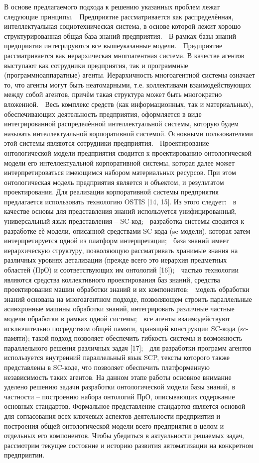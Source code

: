 В основе предлагаемого подхода к решению указанных проблем лежат следующие принципы.
 Предприятие рассматривается как распределѐнная, интеллектуальная социотехническая
система, в основе которой лежит хорошо структурированная общая база знаний предприятия.
 В рамках базы знаний предприятия интегрируются все вышеуказанные модели.
 Предприятие рассматривается как иерархическая многоагентная система. В качестве
агентов выступают как сотрудники предприятия, так и программные (программноаппаратные) агенты. Иерархичность многоагентной системы означает то, что агенты могут быть неатомарными, т.е. коллективами взаимодействующих между собой агентов,
причѐм такая структура может быть многократно вложенной.
 Весь комплекс средств (как информационных, так и материальных), обеспечивающих
деятельность предприятия, оформляется в виде интегрированной распределѐнной интеллектуальной системы, которую будем называть интеллектуальной корпоративной системой. Основными пользователями этой системы являются сотрудники предприятия.
 Проектирование онтологической модели предприятия сводится к проектированию онтологической модели его интеллектуальной корпоративной системы, которая далее может
интерпретироваться имеющимся набором материальных ресурсов. При этом онтологическая модель предприятия является и объектом, и результатом проектирования.
Для реализации корпоративной системы предприятия предлагается использовать технологию OSTIS [14, 15]. Из этого следует:
 в качестве основы для представления знаний используется унифицированный, универсальный язык представления – SC-код;
 разработка системы сводится к разработке еѐ модели, описанной средствами SC-кода
(sc-модели), которая затем интерпретируется одной из платформ интерпретации;
 база знаний имеет иерархическую структуру, позволяющую рассматривать хранимые
знания на различных уровнях детализации (прежде всего это иерархия предметных областей (ПрО) и соответствующих им онтологий [16]);
 частью технологии являются средства коллективного проектирования баз знаний, средства проектирования машин обработки знаний и их компонентов;
 модель обработки знаний основана на многоагентном подходе, позволяющем строить
параллельные асинхронные машины обработки знаний, интегрировать различные
частные модели обработки в рамках одной системы;
 все агенты взаимодействуют исключительно посредством общей памяти, хранящей конструкции SC-кода (sc-памяти); такой подход позволяет обеспечить гибкость системы и
возможность параллельного решения различных задач [17];
 для разработки программ агентов используется внутренний параллельный язык SCP,
тексты которого также представлены в SC-коде, что позволяет обеспечить платформенную независимость таких агентов.
На данном этапе работы основное внимание уделено решению задачи разработки онтологической модели базы знаний, в частности – построению набора онтологий ПрО, описывающих содержание основных стандартов. Формальное представление стандартов является основой для согласования всех ключевых аспектов деятельности предприятия и построения
общей онтологической модели всего предприятия в целом и отдельных его компонентов.
Чтобы убедиться в актуальности решаемых задач, рассмотрим текущее состояние и историю развития автоматизации на конкретном предприятии.

